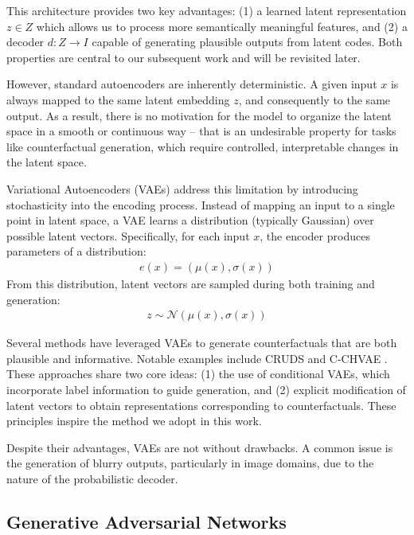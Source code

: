 This architecture provides two key advantages: (1) a learned latent representation $z \in Z$ which allows us to process more semantically meaningful features,
and (2) a decoder $d : Z \to I$ capable of generating plausible outputs from latent codes.
Both properties are central to our subsequent work and will be revisited later.

However, standard autoencoders are inherently deterministic. A given input $x$ is always mapped to the same latent embedding $z$,
and consequently to the same output. As a result, there is no motivation for the model to organize the latent space in a smooth or continuous way -- that is an undesirable property for tasks like counterfactual generation,
which require controlled, interpretable changes in the latent space.

Variational Autoencoders (VAEs) \cite{kingma2019introduction} address this limitation by introducing stochasticity into the encoding process.
Instead of mapping an input to a single point in latent space, a VAE learns a distribution (typically Gaussian) over possible latent vectors.
Specifically, for each input $x$, the encoder produces parameters of a distribution:
\begin{align*}
    e(x) = (\mu(x), \sigma(x))
\end{align*}
From this distribution, latent vectors are sampled during both training and generation:
\begin{align*}
    z \sim \mathcal{N}(\mu(x), \sigma(x))
\end{align*}

Several methods have leveraged VAEs to generate counterfactuals that are both plausible and informative.
Notable examples include CRUDS \cite{downs2020cruds} and C-CHVAE \cite{pawelczyk2020learning}.
These approaches share two core ideas: (1) the use of conditional VAEs, which incorporate label information to guide generation,
and (2) explicit modification of latent vectors to obtain representations corresponding to counterfactuals. These principles inspire the method we adopt in this work.

Despite their advantages, VAEs are not without drawbacks. A common issue is the generation of blurry outputs, particularly in image domains,
due to the nature of the probabilistic decoder.

\subsection{Generative Adversarial Networks}

